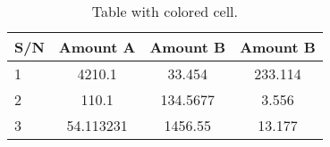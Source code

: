 \documentclass{article}
\begin{document}
	
	\begin{table}[h!]
		\begin{center}
			\caption{Table with colored cell.}
			\label{tab:table1}
			\begin{tabular}{|l|S|c|c|} %
				\hline
				\textbf{S/N} & \textbf{Amount A} &\textbf{Amount B} & \textbf{Amount B}\\
				\hline
				1 & 4210.1 & 33.454 & 233.114\\
				2 & 110.1 & 134.5677 & 3.556\\
				3 & 54.113231 & 1456.55 & 13.177\\
				\hline
				\end{tabular}
		\end{center}
	\end{table}
\end{document}
